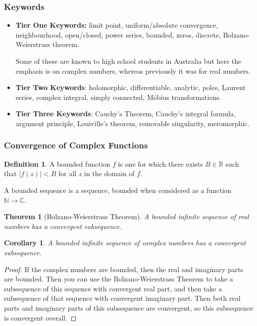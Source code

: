 \documentclass{article}
\newtheorem{theorem}{Theorem}[section]
\newtheorem{cor}{Corollary}[section]
\theoremstyle{definition}
\newtheorem{definition}{Definition}[section]
\theoremstyle{definition}
\theoremstyle{definition}
\newcommand{\C}{\mathbb{C}}
\newcommand{\N}{\mathbb{N}}
\newcommand{\R}{\mathbb{R}}
\begin{document}
\subsubsection{Keywords}
\begin{itemize}
  

\item {\bf Tier One Keywords:} limit point, uniform/absolute convergence, neighbourhood, open/closed, power series, bounded, zeros, discrete, Bolzano-Weierstrass theorem.

Some of these are known to high school students in Australia but here the emphasis is on complex numbers, whereas previously it was for real numbers.

\item {\bf Tier Two Keywords}: holomorphic, differentiable, analytic, poles, Laurent series, complex integral, simply connected, M\"{o}bius transformations.

\item {\bf Tier Three Keywords}: Cauchy's Theorem, Cauchy's integral formula, argument principle, Louiville's theorem, removable singularity, meromorphic.
\end{itemize}



\subsubsection{Convergence of Complex Functions}



\begin{definition} 
    
A bounded function  $f$ is one for which there exists $B\in\R$ such that $|f(z)|<B$ for all $z$ in the domain of $f$.

A bounded sequence is a sequence, bounded when considered as a function $\N\to\C$.
 \end{definition} 

\begin{theorem}[Bolzano-Weierstrass Theorem]
    A bounded infinite sequence of real numbers has a convergent subsequence.
\end{theorem}

\begin{cor}
A bounded infinite sequence of complex numbers has a convergent subsequence.
\end{cor}
\begin{proof}
    If the complex numbers are bounded, then the real and imaginary parts are bounded. Then you can use the Bolzano-Weierstrass Theorem to take a subsequence of this sequence with convergent real part, and then take a subsequence of that sequence with convergent imaginary part. Then both real parts and imaginary parts of this subsequence are convergent, so this subsequence is convergent overall.
\end{proof}
\end{document}
